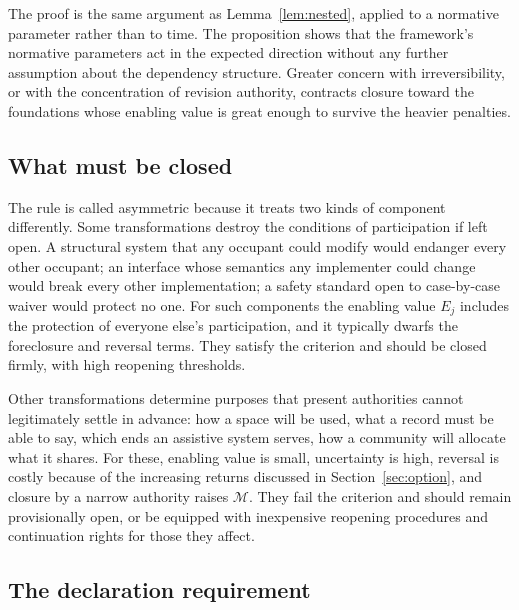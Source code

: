 The proof is the same argument as Lemma~\ref{lem:nested}, applied to a normative parameter rather than to time. The proposition shows that the framework's normative parameters act in the expected direction without any further assumption about the dependency structure. Greater concern with irreversibility, or with the concentration of revision authority, contracts closure toward the foundations whose enabling value is great enough to survive the heavier penalties.

\subsection{What must be closed}

The rule is called asymmetric because it treats two kinds of component differently. Some transformations destroy the conditions of participation if left open. A structural system that any occupant could modify would endanger every other occupant; an interface whose semantics any implementer could change would break every other implementation; a safety standard open to case-by-case waiver would protect no one. For such components the enabling value $E_j$ includes the protection of everyone else's participation, and it typically dwarfs the foreclosure and reversal terms. They satisfy the criterion and should be closed firmly, with high reopening thresholds.

Other transformations determine purposes that present authorities cannot legitimately settle in advance: how a space will be used, what a record must be able to say, which ends an assistive system serves, how a community will allocate what it shares. For these, enabling value is small, uncertainty is high, reversal is costly because of the increasing returns discussed in Section~\ref{sec:option}, and closure by a narrow authority raises $\mathcal{M}$. They fail the criterion and should remain provisionally open, or be equipped with inexpensive reopening procedures and continuation rights for those they affect.

\subsection{The declaration requirement}

